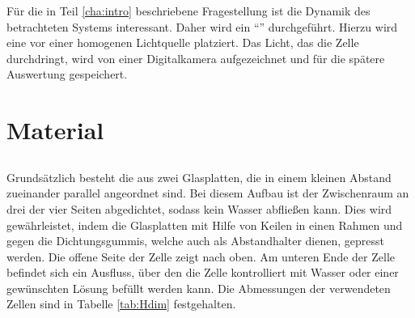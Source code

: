 \label{cha:set}


Für die in Teil \ref{cha:intro} beschriebene Fragestellung ist die Dynamik des betrachteten Systems interessant. Daher wird ein ``\LTM'' durchgeführt. Hierzu wird eine \HSC vor einer homogenen Lichtquelle platziert. Das Licht, das die Zelle durchdringt, wird von einer Digitalkamera aufgezeichnet
und für die spätere Auswertung gespeichert.

\section{Material}
\label{sec:marteria}

\subsection{\HSC}
\label{sec:hsc}
Grundsätzlich besteht die \HSC aus zwei Glasplatten, die in einem kleinen Abstand zueinander parallel angeordnet sind. Bei diesem Aufbau ist der Zwischenraum an drei der vier Seiten abgedichtet, sodass kein Wasser abfließen kann. Dies wird gewährleistet, indem die Glasplatten mit Hilfe von Keilen in einen Rahmen und
gegen die Dichtungsgummis, welche auch als Abstandhalter dienen, gepresst werden. 
Die offene Seite der Zelle zeigt nach oben. Am unteren Ende der Zelle befindet sich ein Ausfluss, über den die Zelle kontrolliert mit Wasser oder einer
gewünschten Lösung befüllt werden kann.
Die Abmessungen der verwendeten Zellen sind in Tabelle \ref{tab:Hdim} festgehalten.


